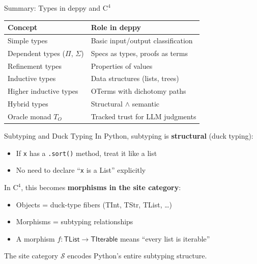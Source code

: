 \documentclass[aspectratio=169,11pt]{beamer}
\newcommand{\Cfour}{\mathrm{C}^4}
\newcommand{\site}{\mathcal{S}}
\begin{document}
\begin{frame}{Summary: Types in deppy and $\Cfour$}
\begin{center}
\begin{tabular}{ll}
\toprule
\textbf{Concept} & \textbf{Role in deppy} \\
\midrule
Simple types & Basic input/output classification \\
Dependent types ($\Pi$, $\Sigma$) & Specs as types, proofs as terms \\
Refinement types & Properties of values \\
Inductive types & Data structures (lists, trees) \\
Higher inductive types & OTerms with dichotomy paths \\
Hybrid types & Structural $\wedge$ semantic \\
Oracle monad $T_O$ & Tracked trust for LLM judgments \\
\bottomrule
\end{tabular}
\end{center}
\end{frame}


\begin{frame}{Subtyping and Duck Typing}
In Python, subtyping is \textbf{structural} (duck typing):

\begin{itemize}
\item If \texttt{x} has a \texttt{.sort()} method, treat it like a list
\item No need to declare ``\texttt{x} is a List'' explicitly
\end{itemize}

\vspace{0.5em}
In $\Cfour$, this becomes \textbf{morphisms in the site category}:
\begin{itemize}
\item Objects = duck-type fibers (TInt, TStr, TList, \ldots)
\item Morphisms = subtyping relationships
\item A morphism $f : \mathsf{TList} \to \mathsf{TIterable}$ means
  ``every list is iterable''
\end{itemize}

The site category $\site$ encodes Python's entire subtyping structure.
\end{frame}
\end{document}
